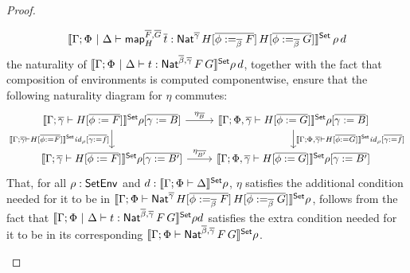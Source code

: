 \documentclass[acmsmall,review,anonymous]{acmart}
\theoremstyle{definition}
\renewcommand{\id}{\mathit{id}}
\newcommand{\map}{\mathsf{map}}
\begin{document}
\begin{proof}
\begin{itemize}
\[
\setsem{\Gamma; \Phi~|~\Delta \vdash
\map^{\ol{F},\ol{G}}_H\, \ol{t} :
\Nat^{\ol{\gamma}}\,H[\ol{\phi :=_{\ol{\beta}} F}]\,H[\ol{\phi
    :=_{\ol{\beta}} G}]}\,\rho\,d
\]
the naturality of
$\llbracket{\Gamma; \Phi~|~\Delta \vdash t : \mathsf{Nat}^{\overline{\beta},\overline{\gamma}}\,F\,G}\rrbracket^{\mathsf{Set}} \rho\, d$,
together with the fact that composition of environments is
computed componentwise, ensure that the following naturality diagram
for $\eta$ commutes:
{\footnotesize
\[\begin{tikzcd}
\setsem{\Gamma ;\ol{\gamma} \vdash H[\ol{\phi := F}]}\rho[\ol{\gamma
      := B}] \ar[r,
  "{\;\;\;\eta_{\ol{B}}\;\;\; }"]
\ar[d, "{\setsem{\Gamma ;\ol{\gamma} \vdash H[\ol{\phi :=
          F}]}\id_{\rho}[\ol{\gamma := f}]}"']
& \setsem{\Gamma ; \Phi, \ol{\gamma} \vdash H[\ol{\phi := G}]}\rho[\ol{\gamma
      := B}]
\ar[d, "{\setsem{\Gamma ; \Phi, \ol{\gamma} \vdash H[\ol{\phi :=
          G}]}\id_{\rho}[\ol{\gamma := f}]}"]\\
\setsem{\Gamma ;\ol{\gamma} \vdash H[\ol{\phi := F}]}\rho[\ol{\gamma
      := B'}] \ar[r,
  "{\eta_{\ol{B'}}}"]
& \setsem{\Gamma ; \Phi, \ol{\gamma} \vdash H[\ol{\phi := G}]}\rho[\ol{\gamma
      := B'}] 
\end{tikzcd}\]}
That, for all $\rho : \mathsf{SetEnv}$ and $d :
  \llbracket{\Gamma;\Phi \vdash \Delta}\rrbracket^{\mathsf{Set}}\rho$,
$\eta$ satisfies the
additional condition needed for it to be in $\llbracket{\Gamma;
  \Phi \vdash \mathsf{Nat}^{\overline{\gamma}}\,H[\overline{\phi :=_{\overline{\beta}}
      F}]\,H[\overline{\phi :=_{\overline{\beta}} G}]}\rrbracket^{\mathsf{Set}}\rho$, follows from the fact
that $\llbracket{\Gamma; \Phi~|~\Delta \vdash t : \mathsf{Nat}^{\overline{\beta},\overline{\gamma}}\,F\,G}\rrbracket^{\mathsf{Set}} \rho d$
satisfies the extra condition needed for it to be
in its corresponding $\llbracket{\Gamma; \Phi \vdash
  \mathsf{Nat}^{\overline{\beta},\overline{\gamma}}\,F\,G}\rrbracket^{\mathsf{Set}}\rho$.


\end{itemize}
\end{proof}
\end{document}
